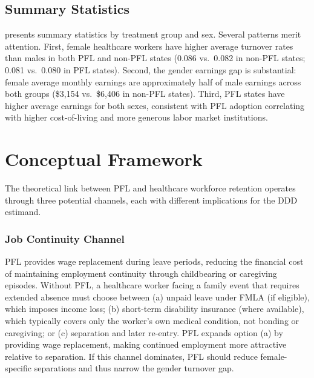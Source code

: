 \documentclass[12pt]{article}
\begin{document}
\subsection{Summary Statistics}

 presents summary statistics by treatment group and sex. Several patterns merit attention. First, female healthcare workers have higher average turnover rates than males in both PFL and non-PFL states (0.086 vs.\ 0.082 in non-PFL states; 0.081 vs.\ 0.080 in PFL states). Second, the gender earnings gap is substantial: female average monthly earnings are approximately half of male earnings across both groups (\$3,154 vs.\ \$6,406 in non-PFL states). Third, PFL states have higher average earnings for both sexes, consistent with PFL adoption correlating with higher cost-of-living and more generous labor market institutions.

\begin{table}[H]
\centering

\end{table}

\section{Conceptual Framework}\label{sec:framework}

The theoretical link between PFL and healthcare workforce retention operates through three potential channels, each with different implications for the DDD estimand.

\subsubsection*{Job Continuity Channel} PFL provides wage replacement during leave periods, reducing the financial cost of maintaining employment continuity through childbearing or caregiving episodes. Without PFL, a healthcare worker facing a family event that requires extended absence must choose between (a) unpaid leave under FMLA (if eligible), which imposes income loss; (b) short-term disability insurance (where available), which typically covers only the worker's own medical condition, not bonding or caregiving; or (c) separation and later re-entry. PFL expands option (a) by providing wage replacement, making continued employment more attractive relative to separation. If this channel dominates, PFL should reduce female-specific separations and thus narrow the gender turnover gap.
\end{document}
